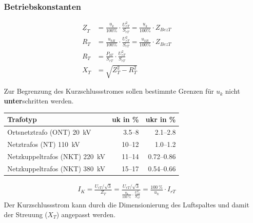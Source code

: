    \subsubsection{Betriebskonstanten}
    \begin{align*}
        \underline{Z}_T &= \frac{\underline{u}_k}{100 \%} \cdot \frac{U_{rT}^2}{S_{rT}} = \frac{\underline{u}_k}{100 \%} \cdot Z_{BezT} \\
        R_T &= \frac{u_{kR}}{100 \%} \cdot \frac{U_{rT}^2}{S_{rT}} = \frac{u_{kR}}{100 \%} \cdot Z_{BezT} \\
        R_T &= \frac{P_{kT}}{S_{rT}} \cdot \frac{U_{rT}^2}{S_{rT}} \\
        X_T &= \sqrt{Z_T^2 - R_T^2} 
    \end{align*}

    Zur Begrenzung des Kurzschlussstromes sollen bestimmte Grenzen für \(u_k\) nicht \textbf{unter}schritten werden.
    \vspace{-6pt} 
    \begin{table}[H]
        \begin{tabular}{l r r}
            \toprule
            \textbf{Trafotyp} & \textbf{uk in \%} & \textbf{ukr in \%} \\
            \midrule
            Ortsnetztrafo (ONT) \SI{20}{\kilo\volt} & \numrange{3.5}{8} & \numrange{2.1}{2.8} \\
            Netztrafos (NT) \SI{110}{\kilo\volt} & \numrange{10}{12} & \numrange{1.0}{1.2} \\
            Netzkuppeltrafos (NKT) \SI{220}{\kilo\volt} & \numrange{11}{14} & \numrange{0.72}{0.86} \\
            Netzkuppeltrafos (NKT) \SI{380}{\kilo\volt} & \numrange{15}{17} & \numrange{0.54}{0.66} \\ 
            \bottomrule
        \end{tabular}
    \end{table} 
    \vspace{-24pt}
    \begin{align*}
        I_K = \frac{U_{rT} / \sqrt{3}}{Z_T} = \frac{U_{rT} / \sqrt{3}}{\frac{u_k}{\SI{100}{\percent}} \cdot \frac{U_{rT}^2}{S_{rT}}} = \frac{\SI{100}{\percent}}{u_k} \cdot I_{rT}
    \end{align*}
    Der Kurzschlussstrom kann durch die Dimensionierung des Luftspaltes und damit der Streuung (\(X_T\)) angepasst werden.

